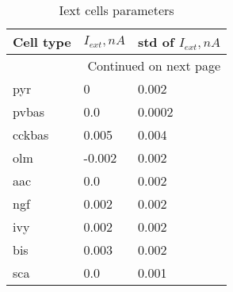 \begin{longtable}{lll}
\caption{Iext cells parameters}
\label{table:iext_table}\\
\toprule
  Cell type & $I_{ext}, nA$ & std of $I_{ext}, nA$ \\
\midrule
\endhead
\midrule
\multicolumn{3}{r}{{Continued on next page}} \\
\midrule
\endfoot

\bottomrule
\endlastfoot
pyr & 0 & 0.002 \\
pvbas & 0.0 & 0.0002 \\
cckbas & 0.005 & 0.004 \\
olm & -0.002 & 0.002 \\
aac & 0.0 & 0.002 \\
ngf & 0.002 & 0.002 \\
ivy & 0.002 & 0.002 \\
bis & 0.003 & 0.002 \\
sca & 0.0 & 0.001 \\
\end{longtable}
